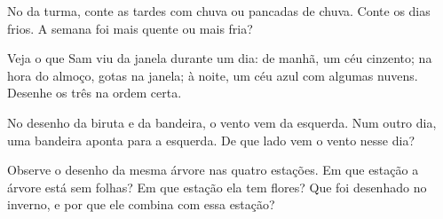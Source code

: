 \begin{exercise}[$\star\star$]\label{exo:g1:watching-the-weather:8}
No  da turma, conte as tardes com chuva ou pancadas de
chuva. Conte os dias frios. A semana foi mais quente ou mais fria?
\end{exercise}

\begin{exercise}[$\star\star$]\label{exo:g1:watching-the-weather:9}
Veja o que Sam viu da janela durante um dia: de manhã, um céu cinzento;
na hora do almoço, gotas na janela; à noite, um céu azul com algumas
nuvens. Desenhe os três  na ordem certa.
\end{exercise}

\begin{exercise}[$\star\star$]\label{exo:g1:watching-the-weather:10}
No desenho da biruta e da bandeira, o vento vem da esquerda. Num outro
dia, uma bandeira aponta para a esquerda. De que lado vem o vento nesse
dia?
\end{exercise}

\begin{exercise}[$\star\star$]\label{exo:g1:watching-the-weather:11}
Observe o desenho da mesma árvore nas quatro estações. Em que estação a
árvore está sem folhas? Em que estação ela tem flores? Que  foi desenhado no inverno, e por que ele combina com essa estação?
\end{exercise}
